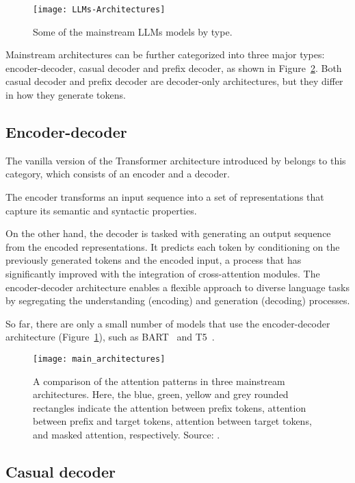 \begin{figure}[H]
	\centering
	\texttt{[image: LLMs-Architectures]}
	\caption{Some of the mainstream LLMs models by type.}
	\label{fig:llms-architectures}
\end{figure}

Mainstream architectures can be further categorized into three major types: encoder-decoder, casual decoder and prefix decoder, as shown in Figure~\ref{fig:architectures}.
Both casual decoder and prefix decoder are decoder-only architectures, but they differ in how they generate tokens.

\subsection{Encoder-decoder}
\label{subsec:encoder-decoder}

The vanilla version of the Transformer architecture introduced by \textcite{vaswani2023attention} belongs to this category, which consists of an encoder and a decoder.

The encoder transforms an input sequence into a set of representations that capture its semantic and syntactic properties.

On the other hand, the decoder is tasked with generating an output sequence from the encoded representations.
It predicts each token by conditioning on the previously generated tokens and the encoded input, a process that has significantly improved with the integration of cross-attention modules.
The encoder-decoder architecture enables a flexible approach to diverse language tasks by segregating the understanding (encoding) and generation (decoding) processes.

So far, there are only a small number of models that use the encoder-decoder architecture (Figure~\ref{fig:llms-architectures}), such as BART~\cite{lewis2020bart} and T5~\cite{raffel2023exploring}.

\begin{figure}[h]
	\centering
	\texttt{[image: main\_architectures]}
	\caption{A comparison of the attention patterns in three mainstream architectures. Here, the blue, green, yellow and grey rounded rectangles indicate the attention between prefix tokens, attention between prefix and target tokens, attention between target tokens, and masked attention, respectively. Source: \textcite{survey}.}
	\label{fig:architectures}
\end{figure}

\subsection{Casual decoder}
\label{subsec:casual-decoder}

